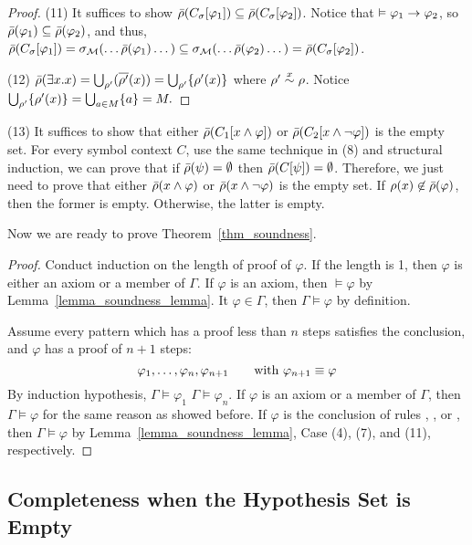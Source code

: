 \documentclass{amsart}
\begin{document}
\begin{proof}
	(11)
	It suffices to show
	$\bar{\rho}(C_{\sigma}[\varphi_1]) \subseteq \bar{\rho}(C_{\sigma}[\varphi_2])$.
	Notice that
	$\vDash \varphi_1 \to \varphi_2$,
	so $\bar{\rho}(\varphi_1) \subseteq \bar{\rho}(\varphi_2)$,
	and thus,
	$\bar{\rho}(C_{\sigma}[\varphi_1])
	= {\sigma_{\mathcal{M}}}(\dots \bar{\rho}(\varphi_1) \dots)
	\subseteq {\sigma_{\mathcal{M}}}(\dots \bar{\rho}(\varphi_2) \dots)
	= \bar{\rho}(C_{\sigma}[\varphi_2])$.
	
	(12)
	$\bar{\rho}(\exists x . x)
	= \bigcup_{\rho'}(\overline{\rho'}(x))
	= \bigcup_{\rho'} \{ \rho'(x) \}$
	where $\rho' \overset{x}{\sim} \rho$.
	Notice $\bigcup_{\rho'} \{ \rho'(x) \} = \bigcup_{a \in M} \{ a \} = M.$
\end{proof}

(13)
It suffices to show that
either
$\bar{\rho}(C_1[x \wedge \varphi])$
or
$\bar{\rho}(C_2[x \wedge \neg \varphi])$ is the empty set.
For every symbol context $C$,
use the same technique in (8) and structural induction,
we can prove that if $\bar{\rho}(\psi) = \emptyset$ then
$\bar{\rho}(C[\psi]) = \emptyset$.
Therefore, we just need to prove that
either
$\bar{\rho}(x \wedge \varphi)$
or
$\bar{\rho}(x \wedge \neg \varphi)$ is the empty set.
If $\rho(x) \not\in \bar{\rho}(\varphi)$, then the former is empty.
Otherwise, the latter is empty.

Now we are ready to prove Theorem~\ref{thm_soundness}.
\soundness*
\begin{proof}
Conduct induction on the length of proof of $\varphi$.
If the length is 1, then $\varphi$ is either an axiom or a member of
$\Gamma$.
If $\varphi$ is an axiom, then $\vDash \varphi$ by 
Lemma~\ref{lemma_soundness_lemma}.
It $\varphi \in \Gamma$, then $\Gamma \vDash \varphi$ by definition.

Assume every pattern which has a proof less than $n$ steps satisfies
the conclusion,
and $\varphi$ has a proof of $n+1$ steps:
$$
\varphi_1 ,\dots, \varphi_{n} , \varphi_{n+1}
\qquad
\text{with $\varphi_{n+1} \equiv \varphi$}
$$
By induction hypothesis,
$\Gamma \vDash \varphi_1$ \ddd $\Gamma \vDash \varphi_n$.
If $\varphi$ is an axiom or a member of $\Gamma$, 
then $\Gamma \vDash \varphi$ for the same reason as showed before.
If $\varphi$ is the conclusion of rules
\modusponens, \universalgeneralization, or \framing,
then $\Gamma \vDash \varphi$ by Lemma~\ref{lemma_soundness_lemma},
Case (4), (7), and (11), respectively.
\end{proof}

\subsection{Completeness when the Hypothesis Set is Empty}
\end{document}
